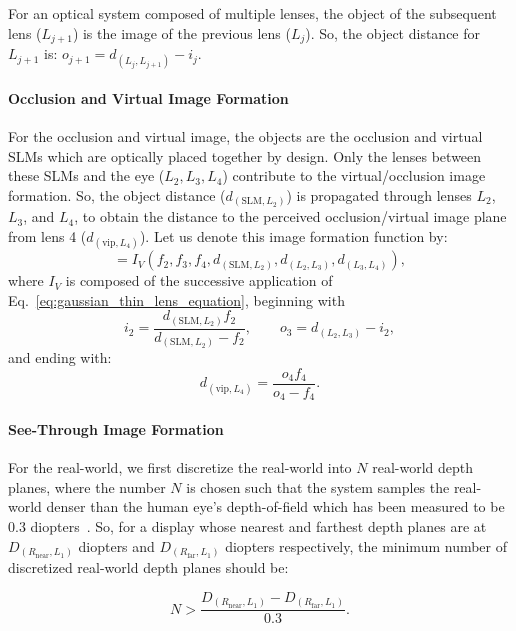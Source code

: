 For an optical system composed of multiple lenses, the object of the subsequent lens ($L_{j+1}$) is the image of the previous lens ($L_{j}$). So, the object distance for $L_{j+1}$ is: $o_{j+1} = d_{(L_j, L_{j+1})} - i_j$.

\paragraph{\textbf{Occlusion and Virtual Image Formation}}
For the occlusion and virtual image, the objects are the occlusion and virtual SLMs which are optically placed together by design. Only the lenses between these SLMs and the eye ($L_2,L_3,L_4$) contribute to the virtual/occlusion image formation. So, the object distance ($d_{(\text{SLM},L_2)}$) is propagated through lenses $L_2$, $L_3$, and $L_4$, to obtain the distance to the perceived occlusion/virtual image plane from lens 4 ($d_{(\text{vip},L_4)}$). Let us denote this image formation function by:
\begin{equation}
[d_{(\text{vip},L_4)}] = I_V(f_2, f_3, f_4, d_{(\text{SLM}, L_2)}, d_{(L_2,L_3)}, d_{(L_3,L_4)}),
\label{eq:optimization_virtual_image_formation}
\end{equation}
where $I_V$ is composed of the successive application of Eq.~\eqref{eq:gaussian_thin_lens_equation}, beginning with
\begin{equation}
i_2 = \frac{d_{(\text{SLM},L_2)} f_2}{d_{(\text{SLM},L_2)}-f_2},
\quad \quad
o_{3} = d_{(L_2,L_3)} - i_2,
\end{equation}
and ending with:
\begin{equation}
d_{(\text{vip},L_4)} = \frac{o_4 f_4}{o_4 - f_4}.
\end{equation}

\paragraph{\textbf{See-Through Image Formation}}
For the real-world, we first discretize the real-world into $N$ real-world depth planes, where the number $N$ is chosen such that the system samples the real-world denser than the human eye's depth-of-field which has been measured to be $0.3$ diopters~\cite{Campbell1957,Watt2005}. So, for a display whose nearest and farthest depth planes are at $D_{(R_{\text{near}}, L_1)}$ diopters and $D_{(R_{\text{far}}, L_1)}$ diopters respectively, the minimum number of discretized real-world depth planes should be:

\begin{equation}
N > \frac{D_{(R_{\text{near}},L_1)} - D_{(R_{\text{far}},L_1)}}{0.3}.
\label{eq:optimization:number_of_planes}
\end{equation}

